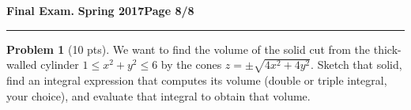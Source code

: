 \documentclass[12pt]{article}
\theoremstyle{definition}
\newtheorem{problem}{Problem}
\begin{document}
\hfill{\large\bf Final Exam.}\hfill{\large\bf
  Spring 2017}\hfill{\large\bf Page 8/8}\hrule

\bigskip
\begin{problem}[10 pts]
We want to find the volume of the solid cut from the thick-walled cylinder $1\leq x^2+y^2 \leq 6$ by the cones $z = \pm \sqrt{4x^2+4y^2}$.  Sketch that solid, find an integral expression that computes its volume (double or triple integral, your choice), and evaluate that integral to obtain that volume.
\vspace{19cm}
\begin{flushright}
\end{flushright}
\end{problem}
\end{document}
